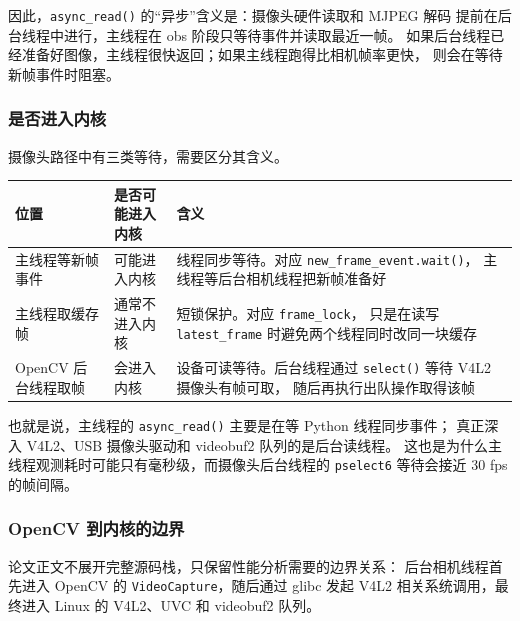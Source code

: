 因此，\texttt{async\_read()} 的“异步”含义是：摄像头硬件读取和 MJPEG 解码
提前在后台线程中进行，主线程在 obs 阶段只等待事件并读取最近一帧。
如果后台线程已经准备好图像，主线程很快返回；如果主线程跑得比相机帧率更快，
则会在等待新帧事件时阻塞。

\subsubsection{是否进入内核}

摄像头路径中有三类等待，需要区分其含义。

\begin{center}
\small
\begin{tabularx}{\textwidth}{>{\raggedright\arraybackslash}p{}
  >{\raggedright\arraybackslash}p{}
  >{\raggedright\arraybackslash}X}
  \toprule
  位置 & 是否可能进入内核 & 含义 \\
  \midrule
  主线程等新帧事件 & 可能进入内核 &
  线程同步等待。对应 \texttt{new\_frame\_event.wait()}，
  主线程等后台相机线程把新帧准备好 \\
  主线程取缓存帧 & 通常不进入内核 &
  短锁保护。对应 \texttt{frame\_lock}，
  只是在读写 \texttt{latest\_frame} 时避免两个线程同时改同一块缓存 \\
  OpenCV 后台线程取帧 & 会进入内核 &
  设备可读等待。后台线程通过 \texttt{select()} 等待 V4L2 摄像头有帧可取，
  随后再执行出队操作取得该帧 \\
  \bottomrule
\end{tabularx}
\end{center}

也就是说，主线程的 \texttt{async\_read()} 主要是在等 Python 线程同步事件；
真正深入 V4L2、USB 摄像头驱动和 videobuf2 队列的是后台读线程。
这也是为什么主线程观测耗时可能只有毫秒级，而摄像头后台线程的
\texttt{pselect6} 等待会接近 30 fps 的帧间隔。

\subsubsection{OpenCV 到内核的边界}

论文正文不展开完整源码栈，只保留性能分析需要的边界关系：
后台相机线程首先进入 OpenCV 的 \texttt{VideoCapture}，随后通过 glibc
发起 V4L2 相关系统调用，最终进入 Linux 的 V4L2、UVC 和 videobuf2 队列。

